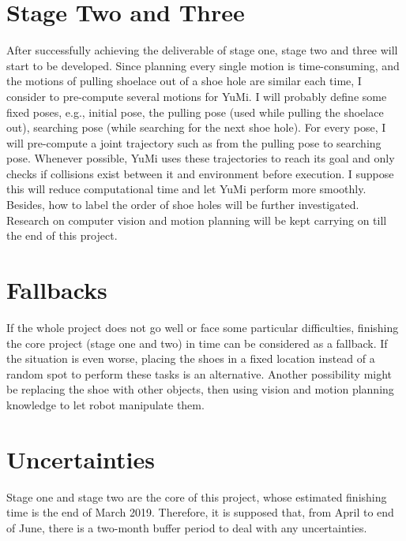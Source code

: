 \section{Stage Two and Three}
After successfully achieving the deliverable of stage one, stage two and three will start to be developed. Since planning every single motion is time-consuming, and the motions of pulling shoelace out of a shoe hole are similar each time, I consider to pre-compute several motions for YuMi. I will probably define some fixed poses, e.g., initial pose, the pulling pose (used while pulling the shoelace out), searching pose (while searching for the next shoe hole). For every pose, I will pre-compute a joint trajectory such as from the pulling pose to searching pose. Whenever possible, YuMi uses these trajectories to reach its goal and only checks if collisions exist between it and environment before execution. I suppose this will reduce computational time and let YuMi perform more smoothly. Besides, how to label the order of shoe holes will be further investigated. Research on computer vision and motion planning will be kept carrying on till the end of this project. 


\section{Fallbacks} %
If the whole project does not go well or face some particular difficulties, finishing the core project (stage one and two) in time can be considered as a fallback. If the situation is even worse, placing the shoes in a fixed location instead of a random spot to perform these tasks is an alternative. Another possibility might be replacing the shoe with other objects, then using vision and motion planning knowledge to let robot manipulate them.


\section{Uncertainties} %

Stage one and stage two are the core of this project, whose estimated finishing time is the end of March 2019. Therefore, it is supposed that, from April to end of June, there is a two-month buffer period to deal with any uncertainties.